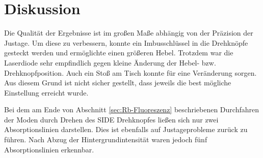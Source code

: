 \newpage
\section{Diskussion}
\label{sec:Diskussion}

Die Qualität der Ergebnisse ist im großen Maße abhängig von der Präzision
der Justage. Um diese zu verbessern, konnte ein Imbusschlüssel in die
Drehknöpfe gesteckt werden und ermöglichte einen größeren Hebel.
Trotzdem war die Laserdiode sehr empfindlich gegen kleine Änderung der
Hebel- bzw. Drehknopfposition.
Auch ein Stoß am Tisch konnte für eine Veränderung sorgen.
Aus diesem Grund ist nicht sicher gestellt, dass jeweils die best mögliche
Einstellung erreicht wurde.

Bei dem am Ende von Abschnitt \ref{sec:Rb-Fluoreszenz} beschriebenen Durchfahren
der Moden durch Drehen des SIDE Drehknopfes ließen sich nur zwei Absorptionslinien
darstellen. Dies ist ebenfalls auf Justageprobleme zurück zu führen.
Nach Abzug der Hintergrundintensität waren jedoch fünf Absorptionslinien
erkennbar.

